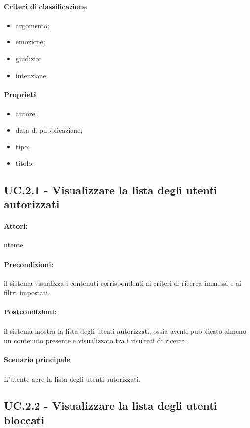 \documentclass[10pt,a4paper,headinclude,footinclude,hidelinks]{scrreprt} %
\begin{document}
	\paragraph{Criteri di classificazione}
	\begin{itemize}
	\item argomento;
	\item emozione;
	\item giudizio;
	\item intenzione.
	\end{itemize}

	\paragraph{Propriet\`a}
	\begin{itemize}
	\item autore;
	\item data di pubblicazione;
	\item tipo;
	\item titolo.
	\end{itemize}

	\subsection[UC.2.1]{UC.2.1 - Visualizzare la lista degli utenti autorizzati}
	\label{sec:stage:ar:uc:2_1}
	\paragraph{Attori:} utente
	\paragraph{Precondizioni:} il sistema visualizza i contenuti corrispondenti ai criteri di ricerca immessi e ai filtri impostati.
	\paragraph{Postcondizioni:} il sistema mostra la lista degli utenti autorizzati, ossia aventi pubblicato almeno un contenuto presente e visualizzato tra i risultati di ricerca.
	\paragraph{Scenario principale}
	L'utente apre la lista degli utenti autorizzati.

	\subsection[UC.2.2]{UC.2.2 - Visualizzare la lista degli utenti bloccati}
	\label{sec:stage:ar:uc:2_2}
\end{document}
